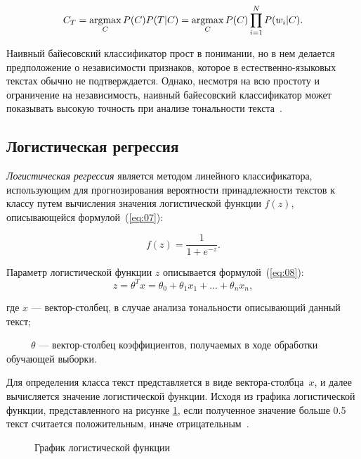 \begin{equation}\label{eq:06}
    C_T = \operatorname*{argmax}_C P(C)P(T|C) = \operatorname*{argmax}_C P(C)\prod\limits_{i=1}^{N} P(w_i|C).
\end{equation}

Наивный байесовский классификатор прост в понимании, но в нем делается
предположение о независимости признаков, которое в естественно-языковых текстах
обычно не подтверждается.  Однако, несмотря на всю простоту и ограничение на
независимость, наивный байесовский классификатор может показывать высокую
точность при анализе тональности текста~\cite{article05}.

\subsection{Логистическая регрессия}

\textit{Логистическая регрессия} является методом линейного классификатора,
использующим для прогнозирования вероятности принадлежности текстов к классу
путем вычисления значения логистической функции $f(z)$, описывающейся
формулой~(\ref{eq:07}):

\begin{equation}\label{eq:07}
    f(z) = \frac{1}{1+e^{-z}}.
\end{equation}

Параметр логистической функции $z$ описывается формулой~(\ref{eq:08}):
\begin{equation}\label{eq:08}
    z = \theta^Tx=\theta_0+\theta_1x_1+...+\theta_nx_n,
\end{equation}

где $x$ --- вектор-столбец, в случае анализа тональности описывающий данный
текст;

~~~~~$\theta$ --- вектор-столбец коэффициентов, получаемых в ходе обработки
обучающей выборки.

Для определения класса текст представляется в виде вектора-столбца~$x$, и
далее вычисляется значение логистической функции. Исходя из графика
логистической функции, представленного на рисунке \ref{img:01}, если полученное
значение больше 0.5 текст считается положительным, иначе
отрицательным~\cite{article18}.

\begin{figure}[h!]
    \begin{center}
    \end{center}
    \caption{График логистической функции}\label{img:01}
\end{figure}

